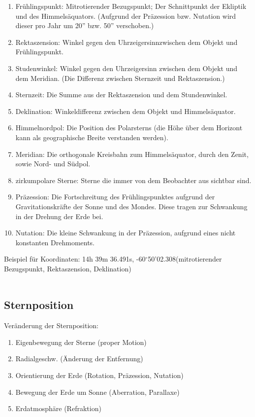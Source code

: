 \documentclass[a4paper,12pt]{article}
\begin{document}
\begin{enumerate}[wide,label=$\cdot$]
        \item Frühlingspunkt: Mitrotierender Bezugspunkt; Der Schnittpunkt der Ekliptik und des Himmelsäquators. (Aufgrund der Präzession bzw. Nutation wird dieser pro Jahr um 20'' bzw. 50'' verschoben.)
        \item Rektaszension: Winkel gegen den Uhrzeigersinnzwischen dem Objekt und Frühlingspunkt.
        \item Studenwinkel: Winkel gegen den Uhrzeigersinn zwischen dem Objekt und dem Meridian. (Die Differenz zwischen Sternzeit und Rektaszension.) 
        \item Sternzeit: Die Summe aus der Rektaszension und dem Stundenwinkel.
        \item Deklination: Winkeldifferenz zwischen dem Objekt und Himmelsäquator.
        \item Himmelnordpol: Die Position des Polarsterns (die Höhe über dem Horizont kann als geographische Breite verstanden werden).
        \item Meridian: Die orthogonale Kreisbahn zum Himmelsäquator, durch den Zenit, sowie Nord- und Südpol.
        \item zirkumpolare Sterne: Sterne die immer von dem Beobachter aus sichtbar sind.
        \item Präzession: Die Fortschreitung des Frühlingspunktes aufgrund der Gravitationskräfte der Sonne und des Mondes. Diese tragen zur Schwankung in der Drehung der Erde bei.
        \item Nutation: Die kleine Schwankung in der Präzession, aufgrund eines nicht konstanten Drehmoments.
\end{enumerate}
Beispiel für Koordinaten: 14h 39m 36.491s, -60$^{\circ}$50'02.308\grqq (mitrotierender Bezugspunkt, Rektaszension, Deklination)\\\\

\subsection{Sternposition}
Veränderung der Sternposition:
\begin{enumerate}[wide,label=-]
        \item Eigenbewegung der Sterne (proper Motion)
        \item Radialgeschw. (Änderung der Entfernung)
        \item Orientierung der Erde (Rotation, Präzession, Nutation)
        \item Bewegung der Erde um Sonne (Aberration, Parallaxe)
        \item Erdatmosphäre (Refraktion)
\end{enumerate}
\end{document}
